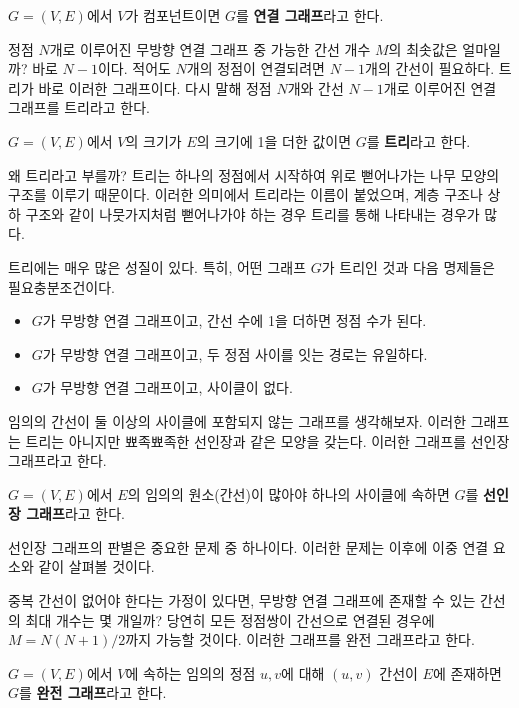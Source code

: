 \begin{definition}[연결 그래프]
    $G=(V, E)$에서 $V$가 컴포넌트이면 $G$를 \textbf{연결 그래프}라고 한다.
\end{definition}

정점 $N$개로 이루어진 무방향 연결 그래프 중 가능한 간선 개수 $M$의 최솟값은 얼마일까? 바로 $N-1$이다. 적어도 $N$개의 정점이 연결되려면 $N-1$개의 간선이 필요하다. 트리가 바로 이러한 그래프이다. 다시 말해 정점 $N$개와 간선 $N-1$개로 이루어진 연결 그래프를 트리라고 한다.

\begin{definition}[트리]
    $G=(V, E)$에서 $V$의 크기가 $E$의 크기에 1을 더한 값이면 $G$를 \textbf{트리}라고 한다.
\end{definition}

왜 트리라고 부를까? 트리는 하나의 정점에서 시작하여 위로 뻗어나가는 나무 모양의 구조를 이루기 때문이다. 이러한 의미에서 트리라는 이름이 붙었으며, 계층 구조나 상하 구조와 같이 나뭇가지처럼 뻗어나가야 하는 경우 트리를 통해 나타내는 경우가 많다.

트리에는 매우 많은 성질이 있다. 특히, 어떤 그래프 $G$가 트리인 것과 다음 명제들은 필요충분조건이다.
\begin{itemize}
    \item $G$가 무방향 연결 그래프이고, 간선 수에 1을 더하면 정점 수가 된다.
    \item $G$가 무방향 연결 그래프이고, 두 정점 사이를 잇는 경로는 유일하다.
    \item $G$가 무방향 연결 그래프이고, 사이클이 없다.
\end{itemize}

임의의 간선이 둘 이상의 사이클에 포함되지 않는 그래프를 생각해보자. 이러한 그래프는 트리는 아니지만 뾰족뾰족한 선인장과 같은 모양을 갖는다. 이러한 그래프를 선인장 그래프라고 한다.

\begin{definition}
    $G=(V, E)$에서 $E$의 임의의 원소(간선)이 많아야 하나의 사이클에 속하면 $G$를 \textbf{선인장 그래프}라고 한다.
\end{definition}

선인장 그래프의 판별은 중요한 문제 중 하나이다. 이러한 문제는 이후에 이중 연결 요소와 같이 살펴볼 것이다.

중복 간선이 없어야 한다는 가정이 있다면, 무방향 연결 그래프에 존재할 수 있는 간선의 최대 개수는 몇 개일까? 당연히 모든 정점쌍이 간선으로 연결된 경우에 $M=N(N+1)/2$까지 가능할 것이다. 이러한 그래프를 완전 그래프라고 한다.

\begin{definition}[완전 그래프]
    $G=(V, E)$에서 $V$에 속하는 임의의 정점 $u, v$에 대해 $(u, v)$ 간선이 $E$에 존재하면 $G$를 \textbf{완전 그래프}라고 한다.
\end{definition}

